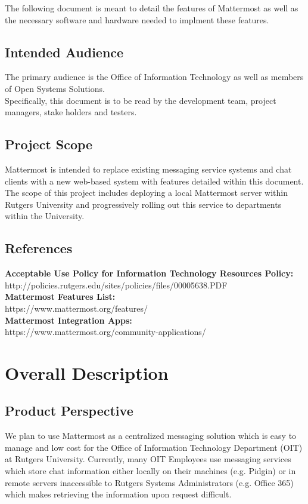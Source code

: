 \documentclass{scrreprt}
\begin{document}
The following document is meant to detail the features of Mattermost as well as
the necessary software and hardware needed to implment these features.

\section{Intended Audience}
The primary audience is the Office of Information Technology as well as members
of Open Systems Solutions.\\

Specifically, this document is to be read by the development team,
project managers, stake holders and testers.

\section{Project Scope}
Mattermost is intended to replace existing messaging service systems and chat
clients with a new web-based system with features detailed within this
document.\\

The scope of this project includes deploying a local Mattermost server within
Rutgers University and progressively rolling out this service to departments
within the University.

\section{References}
\textbf{Acceptable Use Policy for Information Technology Resources Policy:}\\
http://policies.rutgers.edu/sites/policies/files/00005638.PDF\\

\noindent
\textbf{Mattermost Features List:}\\
https://www.mattermost.org/features/\\

\noindent
\textbf{Mattermost Integration Apps:}\\
https://www.mattermost.org/community-applications/\\


\chapter{Overall Description}

\section{Product Perspective}
We plan to use Mattermost as a centralized messaging solution which is easy to
manage and low cost for the Office of Information Technology Department (OIT)
at Rutgers University.  Currently, many OIT Employees use messaging services
which store chat information either locally on their machines (e.g. Pidgin) or
in remote servers inaccessible to Rutgers Systems Administrators (e.g. Office
365) which makes retrieving the information upon request difficult.\\
\end{document}
